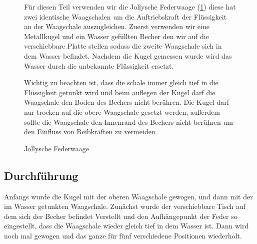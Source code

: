 \documentclass[11pt,a4paper]{article}
\begin{document}
\begin{figure}[h]
\begin{minipage}{.6\textwidth}
Für diesen Teil verwenden wir die Jollysche Federwaage (\ref{JS1}) diese hat zwei identische Waagschalen um die Auftriebskraft der Flüssigkeit an der Waagschale auszugleichen. Zuerst verwenden wir eine Metallkugel und ein Wasser gefüllten Becher den wir auf die verschiebbare Platte stellen sodass die zweite Waagschale sich in dem Wasser befindet. Nachdem die Kugel gemessen wurde wird das Wasser durch die unbekannte Flüssigkeit ersetzt.

 Wichtig zu beachten ist, dass die schale immer gleich tief in die Flüssigkeit getunkt wird und beim auflegen der Kugel darf die Waagschale den Boden des Bechers nicht berühren. Die Kugel darf nur trocken auf die obere Waagschale gesetzt werden, außerdem sollte die Waagschale den Innenrand des Bechers nicht berühren um den Einfluss von Reibkräften zu vermeiden.
\end{minipage}%
\begin{minipage}{.4\textwidth}
\centering
{}
   \renewcommand\thefigure{B1}
\caption[Jollysche Federwaage]{Jollysche Federwaage \cite{Anleitung}}
\label{JS1}

\end{minipage}
\end{figure}

\subsection{Durchführung}

Anfangs wurde die Kugel mit der oberen Waagschale gewogen, und dann mit der im Wasser getunkten Waagschale. Zunächst wurde der verschiebbare Tisch auf dem sich der Becher befindet Verstellt und den Aufhängepunkt der Feder so eingestellt, dass die Waagschale wieder gleich tief in dem Wasser ist. Dann wird noch mal gewogen und das ganze für fünf verschiedene Positionen wiederholt. 
\end{document}
